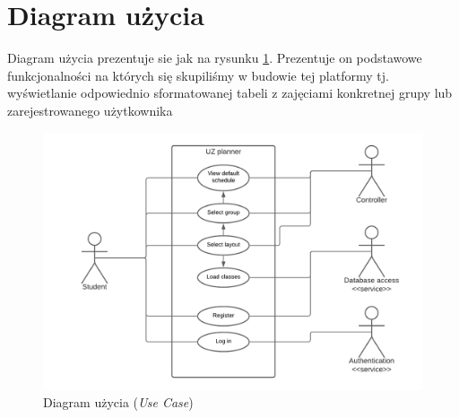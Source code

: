 \documentclass[a4paper,11pt]{uzreport}
\begin{document}
\section{Diagram użycia}
    Diagram użycia prezentuje sie jak na rysunku \ref{fig3}. Prezentuje on podstawowe funkcjonalności na których się skupiliśmy w budowie tej platformy tj. wyświetlanie odpowiednio sformatowanej tabeli z zajęciami konkretnej grupy lub zarejestrowanego użytkownika
    \begin{figure}[ht!]
        \centering
        \includegraphics[width=6in]{pictures/use_case.png}
        \caption{Diagram użycia (\textit{Use Case})}
        \label{fig3}
     \end{figure}
\end{document}
